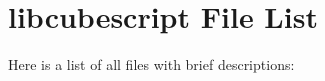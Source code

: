 \section{libcubescript File List}
Here is a list of all files with brief descriptions:\begin{CompactList}
\item{}
\item{}
\end{CompactList}
